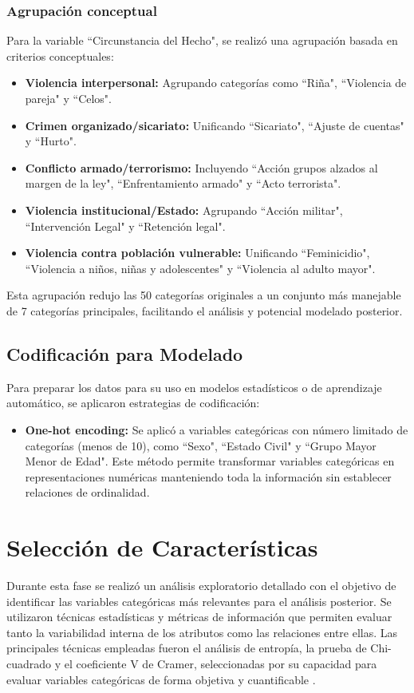 \documentclass[lettersize,journal]{IEEEtran}
\begin{document}
\subsubsection{Agrupación conceptual}
Para la variable ``Circunstancia del Hecho", se realizó una agrupación basada en criterios conceptuales:
\begin{itemize}
\item \textbf{Violencia interpersonal:} Agrupando categorías como ``Riña", ``Violencia de pareja" y ``Celos".
\item \textbf{Crimen organizado/sicariato:} Unificando ``Sicariato", ``Ajuste de cuentas" y ``Hurto".

\item \textbf{Conflicto armado/terrorismo:} Incluyendo ``Acción grupos alzados al margen de la ley", ``Enfrentamiento armado" y ``Acto terrorista".

\item \textbf{Violencia institucional/Estado:} Agrupando ``Acción militar", ``Intervención Legal" y ``Retención legal".

\item \textbf{Violencia contra población vulnerable:} Unificando ``Feminicidio", ``Violencia a niños, niñas y adolescentes" y ``Violencia al adulto mayor".
\end{itemize}
Esta agrupación redujo las 50 categorías originales a un conjunto más manejable de 7 categorías principales, facilitando el análisis y potencial modelado posterior.
\subsection{Codificación para Modelado}
Para preparar los datos para su uso en modelos estadísticos o de aprendizaje automático, se aplicaron estrategias de codificación:
\begin{itemize}
\item \textbf{One-hot encoding:} Se aplicó a variables categóricas con número limitado de categorías (menos de 10), como ``Sexo", ``Estado Civil" y ``Grupo Mayor Menor de Edad". Este método permite transformar variables categóricas en representaciones numéricas manteniendo toda la información sin establecer relaciones de ordinalidad.
\end{itemize}
\section{Selección de Características}

Durante esta fase se realizó un análisis exploratorio detallado con el objetivo de identificar las variables categóricas más relevantes para el análisis posterior. Se utilizaron técnicas estadísticas y métricas de información que permiten evaluar tanto la variabilidad interna de los atributos como las relaciones entre ellas. Las principales técnicas empleadas fueron el análisis de entropía, la prueba de Chi-cuadrado y el coeficiente V de Cramer, seleccionadas por su capacidad para evaluar variables categóricas de forma objetiva y cuantificable \cite{tan2018introduction}.
\end{document}
